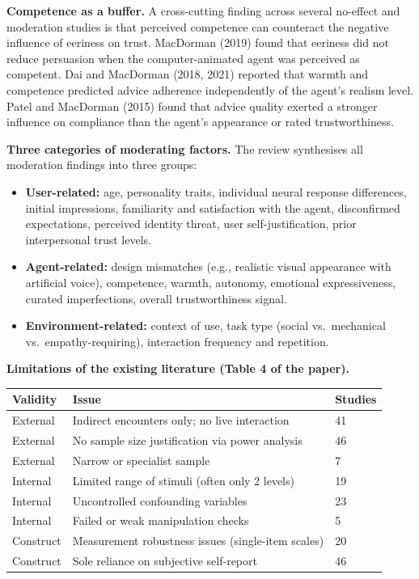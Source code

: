 \documentclass[11pt, a4paper]{article}
\begin{document}
\medskip
\textbf{Competence as a buffer.} A cross-cutting finding across several no-effect and moderation studies is that perceived competence can counteract the negative influence of eeriness on trust. MacDorman (2019) found that eeriness did not reduce persuasion when the computer-animated agent was perceived as competent. Dai and MacDorman (2018, 2021) reported that warmth and competence predicted advice adherence independently of the agent's realism level. Patel and MacDorman (2015) found that advice quality exerted a stronger influence on compliance than the agent's appearance or rated trustworthiness.

\medskip
\textbf{Three categories of moderating factors.} The review synthesises all moderation findings into three groups:

\begin{itemize}
  \item \textbf{User-related:} age, personality traits, individual neural response differences, initial impressions, familiarity and satisfaction with the agent, disconfirmed expectations, perceived identity threat, user self-justification, prior interpersonal trust levels.
  \item \textbf{Agent-related:} design mismatches (e.g., realistic visual appearance with artificial voice), competence, warmth, autonomy, emotional expressiveness, curated imperfections, overall trustworthiness signal.
  \item \textbf{Environment-related:} context of use, task type (social vs.\ mechanical vs.\ empathy-requiring), interaction frequency and repetition.
\end{itemize}

\medskip
\textbf{Limitations of the existing literature (Table 4 of the paper).}

\begin{center}
\begin{tabular}{@{}p{3.5cm}p{5.5cm}p{2cm}@{}}
\toprule
\textbf{Validity} & \textbf{Issue} & \textbf{Studies} \\
\midrule
External & Indirect encounters only; no live interaction & 41 \\
External & No sample size justification via power analysis & 46 \\
External & Narrow or specialist sample & 7 \\
Internal & Limited range of stimuli (often only 2 levels) & 19 \\
Internal & Uncontrolled confounding variables & 23 \\
Internal & Failed or weak manipulation checks & 5 \\
Construct & Measurement robustness issues (single-item scales) & 20 \\
Construct & Sole reliance on subjective self-report & 46 \\
\bottomrule
\end{tabular}
\end{center}
\end{document}
